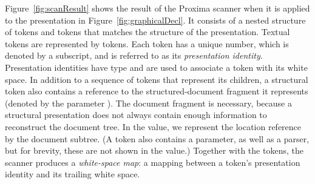\documentclass{article}[10pt]
\begin{document}
Figure~\ref{fig:scanResult} shows the result of the Proxima scanner when it is applied to the presentation in Figure~\ref{fig:graphicalDecl}. It consists of a nested structure of  tokens and  tokens that matches the structure of the presentation. Textual tokens are represented by  tokens. Each token has a unique number, which is denoted by a subscript, and is referred to as its {\em presentation identity}. Presentation identities have type  and are used to associate a token with its white space. In addition to a sequence of tokens that represent its children, a structural token also contains a reference to the structured-document fragment it represents (denoted by the parameter ). The document fragment is necessary, because a structural presentation does not always contain enough information to reconstruct the document tree. In the  value, we represent the location reference by the document subtree. (A  token also contains a  parameter, as well as a parser, but for brevity, these are not shown in the value.) Together with the tokens, the scanner produces a {\em white-space map}: a mapping between a token's presentation identity and its trailing white space.
\end{document}

